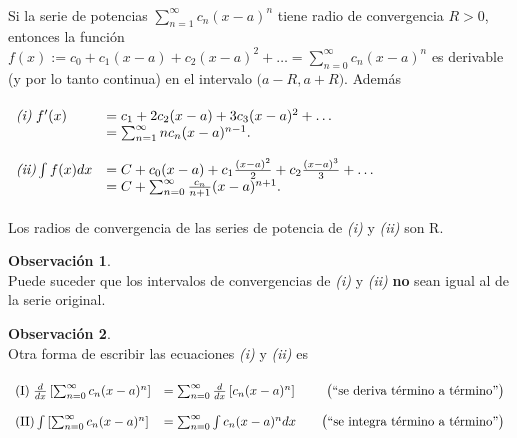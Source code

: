 \documentclass{article}
\theoremstyle{definition}
\theoremstyle{definition}
\newtheorem*{obs}{Observación}
\theoremstyle{remark}
\begin{document}
\begin{teo} \; \\
  Si la serie de potencias $\sum_{n=1}^{\infty}{c_n(x-a)^n}$ tiene radio de convergencia $R>0$, entonces la función $f(x) := c_0 + c_1 (x-a) + c_2 (x-a)^2 + \dots = \sum_{n=0}^{\infty}{c_n(x-a)^n}$ es derivable (y por lo tanto continua) en el intervalo $\big(a-R, a + R\big)$. Además  \\\\ $\begin{array}{ll}
    \emph{(i)\phantom{i}} f'(x) & = c_1+2c_2(x-a)+3c_3(x-a)^2+\dots \\
                                & = \sum_{n=1}^{\infty}{nc_n(x-a)^{n-1}}.  \\\\
    \emph{(ii)} \int{f(x)dx} & = C+c_0(x-a)+c_1\frac{(x-a)^2}{2}+c_2\frac{(x-a)^3}{3}+\dots \\ 
                             & =C+\sum_{n=0}^{\infty}{\frac{c_n}{n+1}(x-a)^{n+1}}. 
  \end{array}$ \\ \\ Los radios de convergencia de las series de potencia de \emph{(i)} y \emph{(ii)} son R.
\end{teo} \pagebreak
\begin{obs} \; \\
  Puede suceder que los intervalos de convergencias de \emph{(i)} y \emph{(ii)} \textbf{no} sean igual al de la serie original.
\end{obs}
 
\begin{obs} \; \\
Otra forma de escribir las ecuaciones \emph{(i)} y \emph{(ii)} es \\ \\ $\begin{array}{llcr}
\text{(I)\phantom{i}} \frac{d}{dx} \left[\sum_{n=0}^{\infty}{c_n(x-a)^n}\right] &  =\sum_{n=0}^{\infty}{\frac{d}{dx}\left[c_n(x-a)^n\right]} & & \text{\big(``se deriva término a término''\big)}\\ \\
\text{(II)} \int{\left[\sum_{n=0}^{\infty}{c_n(x-a)^n}\right]} &  =\sum_{n=0}^{\infty}{\int{c_n(x-a)^ndx}}& & \text{\big(``se integra término a término''\big)}\\

\end{array}$
\end{obs}
\end{document}
